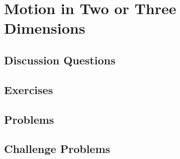 
\chapter{Motion in Two or Three Dimensions}

\section{Discussion Questions}

\section{Exercises}

\section{Problems}

\section{Challenge Problems}
